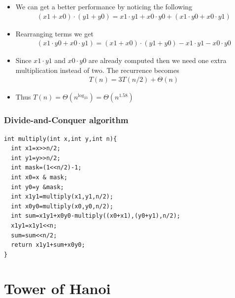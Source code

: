 \documentclass{beamer}
\begin{document}
\begin{frame}
  \begin{itemize}
  \item We can get a better performance by noticing the following
    \begin{align*}
      (x1+x0)\cdot (y1+y0)=x1\cdot y1+x0\cdot y0+(x1\cdot y0+x0\cdot y1)
    \end{align*}
\item Rearranging terms we get
  \begin{align*}
(x1\cdot y0+x0\cdot y1)=(x1+x0)\cdot (y1+y0)-x1\cdot y1-x0\cdot y0
  \end{align*}
\item Since $x1\cdot y1$ and $x0\cdot y0$ are already computed then we need one extra multiplication instead of two. The recurrence becomes
  \begin{align*}
    T(n)=3T(n/2)+\Theta(n)
  \end{align*}
\item Thus $T(n)=\Theta(n^{\log_23})=\Theta(n^{1.58})$
  \end{itemize}
\end{frame}
\begin{frame}[fragile]
  \frametitle{Divide-and-Conquer algorithm}
\begin{lstlisting}
int multiply(int x,int y,int n){
  int x1=x>>n/2;
  int y1=y>>n/2;
  int mask=(1<<n/2)-1;
  int x0=x & mask;
  int y0=y &mask;
  int x1y1=multiply(x1,y1,n/2);
  int x0y0=multiply(x0,y0,n/2);
  int sum=x1y1+x0y0-multiply((x0+x1),(y0+y1),n/2);
  x1y1=x1y1<<n;
  sum=sum<<n/2;
  return x1y1+sum+x0y0;
}
\end{lstlisting}

\end{frame}

\section{Tower of Hanoi}
\end{document}
